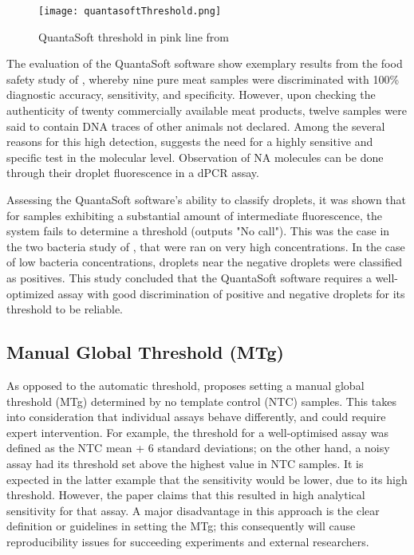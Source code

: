 \begin{figure}[h]
    \centering
    \texttt{[image: quantasoftThreshold.png]}
    \caption[QuantaSoft threshold from a study]{QuantaSoft threshold in pink line from \cite{hussainThreshold}}
        \label{fig:demoQuantThreshold}
\end{figure}

The evaluation of the QuantaSoft software show exemplary results from the food safety study of , whereby nine pure meat samples were discriminated with 100\% diagnostic accuracy, sensitivity, and specificity. However, upon checking the authenticity of twenty commercially available meat products, twelve samples were said to contain DNA traces of other animals not declared. Among the several reasons for this high detection,  suggests the need for a highly sensitive and specific test in the molecular level. Observation of NA molecules can be done through their droplet fluorescence in a dPCR assay.

Assessing the QuantaSoft software's ability to classify droplets, it was shown that for samples exhibiting a substantial amount of intermediate fluorescence, the system fails to determine a threshold (outputs "No call"). This was the case in the two bacteria study of \cite{Dreo2014}, that were ran on very high concentrations. In the case of low bacteria concentrations, droplets near the negative droplets were classified as positives. This study concluded that the QuantaSoft software requires a well-optimized assay with good discrimination of positive and negative droplets for its threshold to be reliable.


\subsection{Manual Global Threshold (MTg)}
\label{sec:manthreshold}
As opposed to the automatic threshold,  proposes setting a manual global threshold (MTg) determined by no template control (NTC) samples. This takes into consideration that individual assays behave differently, and could require expert intervention. For example, the threshold for a well-optimised assay was defined as the NTC mean + 6 standard deviations; on the other hand, a noisy assay had its threshold set above the highest value in NTC samples. It is expected in the latter example that the sensitivity would be lower, due to its high threshold. However, the paper claims that this resulted in high analytical sensitivity for that assay. A major disadvantage in this approach is the clear definition or guidelines in setting the MTg; this consequently will cause reproducibility issues for succeeding experiments and external researchers.

